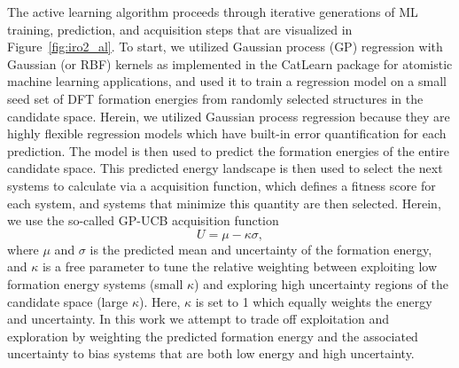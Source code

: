 %
%
The active learning algorithm proceeds through iterative generations of ML training, prediction, and acquisition steps that are visualized in Figure~\ref{fig:iro2_al}.
%
To start, we utilized Gaussian process (GP) regression with Gaussian (or RBF) kernels as implemented in the CatLearn\cite{hansen2019atomistic,CatLearn_Repo} package for atomistic machine learning applications, and used it to train a regression model on a small seed set of DFT formation energies from randomly selected structures in the candidate space.
%
Herein, we utilized Gaussian process regression because they are highly flexible regression models which have built-in error quantification for each prediction.
%
The model is then used to predict the formation energies of the entire candidate space.
%
This predicted energy landscape is then used to select the next systems to calculate via a acquisition function, which defines a fitness score for each system, and systems that minimize this quantity are then selected.
%
Herein, we use the so-called GP-UCB acquisition function
%
\begin{equation}
    U = \mu - \kappa \sigma,
\end{equation}
%
where $\mu$ and $\sigma$ is the predicted mean and uncertainty of the formation energy,
and $\kappa$ is a free parameter to tune the relative weighting between exploiting low formation energy systems (small $\kappa$) and exploring high uncertainty regions of the candidate space (large $\kappa$).
%
Here, $\kappa$ is set to \num{1} which equally weights the energy and uncertainty.
%
In this work we attempt to trade off exploitation and exploration by weighting the predicted formation energy and the associated uncertainty to bias systems that are both low energy and high uncertainty.
%

